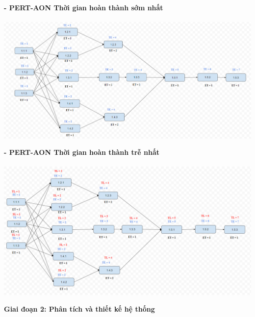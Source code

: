 \documentclass[12pt]{article}
\begin{document}
\hspace{1cm}\textbf{- PERT-AON Thời gian hoàn thành sớm nhất \\\\} 
\vspace*{0.5cm}    
\hspace{0.7cm}\includegraphics[width=14.5cm]{PERT1_1.png}
\vspace{0.5cm}  

\hspace{1cm}\textbf{- PERT-AON Thời gian hoàn thành trễ nhất \\\\} 
\vspace*{0.5cm}    
\hspace{0.7cm}\includegraphics[width=14.5cm]{PERT1_2.png}
\vspace{0.5cm}  

\begin{center}
    \textbf{Giai đoạn 2: Phân tích và thiết kế hệ thống}
\end{center}
 
\end{document}
